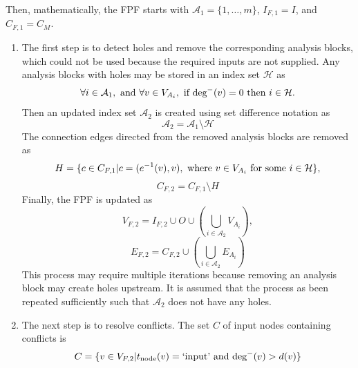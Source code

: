 Then, mathematically, the FPF starts with $\mathcal A_1 = \{1,\ldots,m\}$, $I_{F,1} = I$, and $C_{F,1} = C_M$.



\begin{enumerate}
\item The first step is to detect holes and remove the corresponding analysis blocks, which could not be used because the required inputs are not supplied. Any analysis blocks with holes may be stored in an index set $\mathcal H$ as
\begin{equation}
\forall i \in \mathcal A_1,\textrm{ and }\forall v \in V_{A_i},\textrm{ if deg}^-(v)=0 \textrm{ then } i \in \mathcal H.
\end{equation}
Then an updated index set $\mathcal A_2$ is created using set difference notation as
\begin{equation}
\mathcal A_2 = \mathcal A_1 \setminus \mathcal H
\end{equation}The connection edges directed from the removed analysis blocks are removed as
\begin{equation}
H = \{c \in C_{F,1} |c = (e^{-1}(v),v), \textrm{ where } v \in V_{A_i} \textrm{ for some } i \in \mathcal H\},
\end{equation}
\begin{equation}
C_{F,2} = C_{F,1} \setminus H
\end{equation}
Finally, the FPF is updated as
\begin{equation}
V_{F,2} = I_{F,2} \cup O \cup \left( \bigcup_{i \in \mathcal A_2} V_{A_i} \right),
\end{equation}
\begin{equation}
E_{F,2} = C_{F,2} \cup \left( \bigcup_{i \in \mathcal A_2} E_{A_i} \right)
\end{equation}
This process may require multiple iterations because removing an analysis block may create holes upstream. It is assumed that the process as been repeated sufficiently such that $\mathcal A_2$ does not have any holes.

\item The next step is to resolve conflicts. The set $C$ of input nodes containing conflicts is
\begin{equation}
C = \{v \in V_{F,2} | t_\textrm{node}(v) = \textrm{`input'} \textrm{ and } \textrm{deg}^-(v) > d(v)\}
\end{equation}
\end{enumerate}

